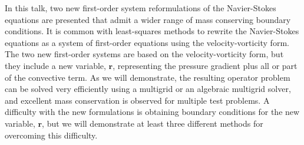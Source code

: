 \documentclass{report}
\begin{document}
In this talk, two new first-order system reformulations of the
Navier-Stokes equations are presented that admit a wider range of mass
conserving boundary conditions. It is common with least-squares methods
to rewrite the Navier-Stokes equations as a system of first-order
equations using the velocity-vorticity form. The two new first-order
systems are based on the velocity-vorticity form, but they include a new
variable, {$\mathbf{r}$}, representing the pressure gradient plus all or
part of the convective term. As we will demonstrate, the resulting
operator problem can be solved very efficiently using a multigrid or an
algebraic multigrid solver, and excellent mass conservation is observed
for multiple test problems. A difficulty with the new formulations is
obtaining boundary conditions for the new variable, {$\mathbf{r}$}, but
we will demonstrate at least three different methods for overcoming this
difficulty.
\end{document}
